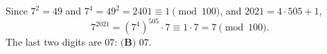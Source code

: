 Since $7^2=49$ and $7^4=49^2=2401\equiv1\pmod{100}$, and $2021=4\cdot505+1$,
\[7^{2021}=\left(7^4\right)^{505}\cdot7\equiv1\cdot7=7\pmod{100}.\]
The last two digits are $07$: $\boxed{\textbf{(B) }07}$.
